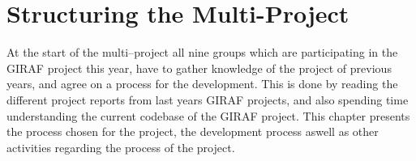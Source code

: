 \chapter{Structuring the Multi-Project}

At the start of the multi--project all nine groups which are participating in the GIRAF project this year, have to gather knowledge of the project of previous years, and agree on a process for the development.
This is done by reading the different project reports from last years GIRAF projects, and also spending time understanding the current codebase of the GIRAF project.
This chapter presents the process chosen for the project, the development process aswell as other activities regarding the process of the project.


